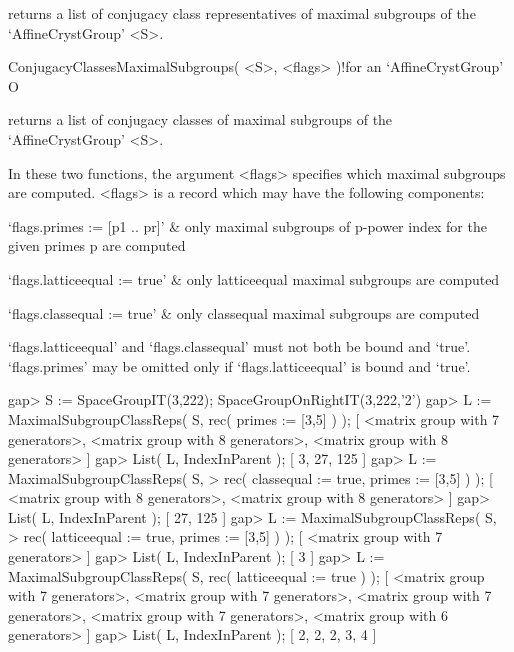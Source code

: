 returns a list of conjugacy class representatives of maximal subgroups
of the `AffineCrystGroup' <S>.

\>ConjugacyClassesMaximalSubgroups( <S>, <flags> )!{for an `AffineCrystGroup'} O

returns a list of conjugacy classes of maximal subgroups
of the `AffineCrystGroup' <S>.

In these two functions, the argument <flags> specifies which maximal
subgroups are computed. <flags> is a record which may have the following
components:

\beginitems

   `flags.primes := [p1 .. pr]' &
   only maximal subgroups of p-power index for the given primes p are 
   computed 

   `flags.latticeequal := true' &
   only latticeequal maximal subgroups are computed

   `flags.classequal := true' &
   only classequal maximal subgroups are computed

\enditems

`flags.latticeequal' and `flags.classequal' must not both be bound
and `true'. `flags.primes' may be omitted only if `flags.latticeequal' 
is bound and `true'.

\beginexample
gap> S := SpaceGroupIT(3,222);
SpaceGroupOnRightIT(3,222,'2')
gap> L := MaximalSubgroupClassReps( S, rec( primes := [3,5] ) );
[ <matrix group with 7 generators>, <matrix group with 8 generators>, 
  <matrix group with 8 generators> ]
gap> List( L, IndexInParent );
[ 3, 27, 125 ]
gap> L := MaximalSubgroupClassReps( S,             
>                  rec( classequal := true, primes := [3,5] ) );
[ <matrix group with 8 generators>, <matrix group with 8 generators> ]
gap> List( L, IndexInParent );                                                 
[ 27, 125 ]
gap> L := MaximalSubgroupClassReps( S,
>                  rec( latticeequal := true, primes := [3,5] ) );
[ <matrix group with 7 generators> ]
gap> List( L, IndexInParent );                                       
[ 3 ]
gap> L := MaximalSubgroupClassReps( S, rec( latticeequal := true ) );
[ <matrix group with 7 generators>, <matrix group with 7 generators>, 
  <matrix group with 7 generators>, <matrix group with 7 generators>, 
  <matrix group with 6 generators> ]
gap> List( L, IndexInParent );                                       
[ 2, 2, 2, 3, 4 ]
\endexample


